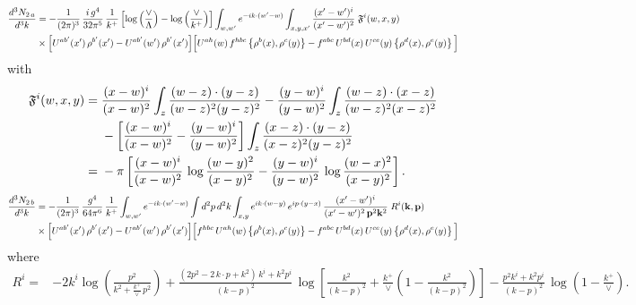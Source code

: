 \documentclass[9pt]{article}
\numberwithin{equation}{section}
\begin{document}
\begin{align}
\frac{d^{3}N_{2\,a}}{d^{3}k} & = -\frac{1}{(2\pi)^{3}}\,\frac{i\,g^{4}}{32\pi^{5}}\,\frac{1}{k^{+}}
\left[\log\left(\frac{\vee}{\Lambda}\right)-\log\left(\frac{\vee}{k^{+}}\right)\right]
\int_{w,w'} e^{-ik\cdot(w'-w)}\int_{x,y,x'}\frac{(x'-w')^{i}}{(x'-w')^{2}}\;\mathfrak{F}^{i}(w,x,y)\notag\\
&\times\Big[U^{ab'}(x')\,\rho^{b'}(x')-U^{ab'}(w')\,\rho^{b'}(x')\Big]
\Big[U^{ah}(w)\,f^{hbc}\left\{\rho^{b}(x),\rho^{c}(y)\right\}-f^{abc}\,U^{bd}(x)\,U^{ce}(y)\left\{\rho^{d}(x),\rho^{e}(y)\right\}\Big]
\end{align}
with
\begin{align}
\mathfrak{F}^{i}(w,x,y) ={}& \frac{(x-w)^{i}}{(x-w)^{2}}\int_{z}\frac{(w-z)\cdot(y-z)}{(w-z)^{2}(y-z)^{2}}
-\frac{(y-w)^{i}}{(y-w)^{2}}\int_{z}\frac{(w-z)\cdot(x-z)}{(w-z)^{2}(x-z)^{2}}\notag\\
&-\left[\frac{(x-w)^{i}}{(x-w)^{2}}-\frac{(y-w)^{i}}{(y-w)^{2}}\right]\int_{z}\frac{(x-z)\cdot(y-z)}{(x-z)^{2}(y-z)^{2}}\\
={}& -\pi\left[\frac{(x-w)^{i}}{(x-w)^{2}}\,\log\frac{(w-y)^{2}}{(x-y)^{2}}-\frac{(y-w)^{i}}{(y-w)^{2}}\,\log\frac{(w-x)^{2}}{(x-y)^{2}}\right].
\end{align}
\begin{align}
\frac{d^{3}N_{2\,b}}{d^{3}k} & = -\frac{1}{(2\pi)^{3}}\,\frac{g^{4}}{64\pi^{6}}\,\frac{1}{k^{+}}\int_{w,w'} e^{-ik\cdot(w'-w)}
\int d^{2}p\,d^{2}k\int_{x,y} e^{ik\cdot(w-y)}\,e^{ip\cdot(y-x)}\,\frac{(x'-w')^{i}}{(x'-w')^{2}\,\mathbf{p}^{2}\mathbf{k}^{2}}\;R^{i}(\mathbf{k},\mathbf{p})\notag\\
&\times\Big[U^{ab'}(x')\,\rho^{b'}(x')-U^{ab'}(w')\,\rho^{b'}(x')\Big]
\Big[f^{hbc}\,U^{ah}(w)\left\{\rho^{b}(x),\rho^{c}(y)\right\}-f^{abc}\,U^{bd}(x)\,U^{ce}(y)\left\{\rho^{d}(x),\rho^{e}(y)\right\}\Big]
\end{align}
where
\begin{align}
R^{i} =& -2k^{i}\log\left(\frac{p^{2}}{k^{2}+\frac{k^{+}}{\vee}\,p^{2}}\right)
+\frac{(2p^{2}-2\,k\cdot p+k^{2})\,k^{i}+k^{2}p^{i}}{(k-p)^{2}}\,
\log\left[\frac{k^{2}}{(k-p)^{2}}+\frac{k^{+}}{\vee}\left(1-\frac{k^{2}}{(k-p)^{2}}\right)\right]
-\frac{p^{2}k^{i}+k^{2}p^{i}}{(k-p)^{2}}\,\log\left(1-\frac{k^{+}}{\vee}\right).
\end{align}
\end{document}
